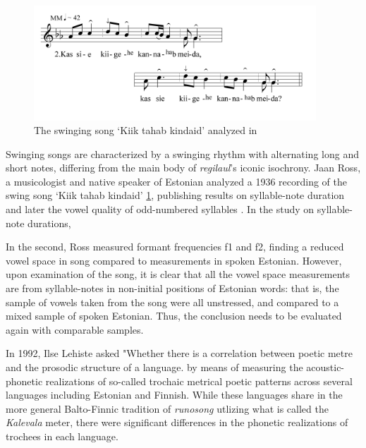 \begin{figure}[htb]
\begin{center}
\includegraphics[width=300pt]{figures/022.png}
\caption{The swinging song `Kiik tahab kindaid' analyzed in \cite{ross1989,ross1992}}
\label{022swing}
\end{center}
\end{figure}

Swinging songs are characterized by a swinging rhythm with alternating long and short notes, differing from the main body of {\it regilaul}'s iconic isochrony. 
Jaan Ross, a musicologist and native speaker of Estonian analyzed a 1936 recording of the swing song `Kiik tahab kindaid' \ref{022swing}, publishing results on syllable-note duration \cite{ross1989} and later the vowel quality of odd-numbered syllables \citep{ross1992}. In the study on syllable-note durations, 

In the second, Ross measured formant frequencies f1 and f2, finding a reduced vowel space in song compared to measurements in spoken Estonian. However, upon examination of the song, it is clear that all the vowel space measurements are from syllable-notes in non-initial positions of Estonian words: that is, the sample of vowels taken from  the song were all unstressed, and compared to a mixed sample of spoken Estonian. Thus, the conclusion needs to be evaluated again with comparable samples. 

%
In 1992, Ilse Lehiste asked "Whether there is a correlation between poetic metre and the prosodic structure of a language.\citep{lehiste1992} by means of measuring the acoustic-phonetic realizations of so-called trochaic metrical poetic patterns across several languages including Estonian and Finnish. While these languages share in the more general Balto-Finnic tradition of {\it runosong} utlizing what is called the {\it Kalevala} meter, there were significant differences in the phonetic realizations of trochees in each language. 


